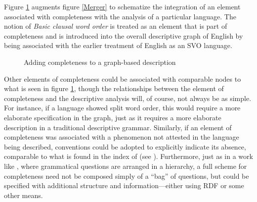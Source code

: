 \documentclass[12pt]{article}
\newcommand{\fref}[1]{figure \ref{#1}}
\newcommand\namecite{\citet}
\begin{document}
Figure \ref{MergeIndex} augments \fref{Merger} to schematize the integration
of an element associated with completeness with the analysis of a
particular language. The notion of \emph{Basic clausal word order} is treated
as an element that is part of completeness and is introduced into the overall
descriptive graph of English by being associated with the earlier treatment
of English as an SVO language.

\begin{figure}[ht]
\centering
{}
\caption{Adding completeness to a graph-based description \label{MergeIndex}}
\end{figure}

Other elements of completeness could be associated with comparable nodes to what
is seen in \fref{MergeIndex}, though the relationships between the element of
completeness and the descriptive analysis will, of course, not always be as
simple. For instance, if a language showed split word order, this would require
a more elaborate specification in the graph, just as it requires a more
elaborate description in a traditional descriptive grammar. Similarly, if an
element of completeness was associated with a phenomenon not attested in the
language being described, conventions could be adopted to explicitly indicate
its absence, comparable to what is found in the index of
\namecite{Haspelmath:1993Lezgian} (see
\namecite[{\S}2.1]{Good:2004Metadatabase}). Furthermore, just as in a work like
\namecite{ComrieSmith:1977}, where grammatical questions are arranged in a
hierarchy, a full scheme for completeness need not be composed simply of a
``bag'' of questions, but could be specified with additional structure and
information---either using RDF or some other means.
\end{document}
